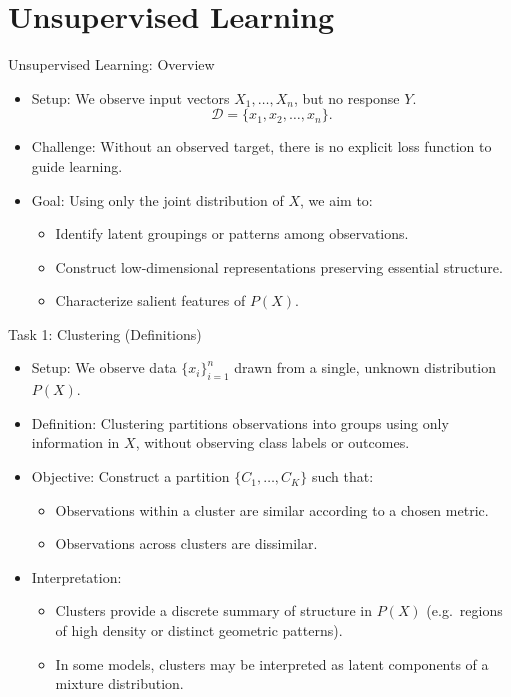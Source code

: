 \documentclass[aspectratio=169]{beamer}
\newcommand{\1}{\mathbf{1}}
\newcommand{\D}{\mathcal{D}}
\begin{document}
\section{Unsupervised Learning}

\begin{frame}{Unsupervised Learning: Overview}
    \small
    \begin{itemize}
        \item Setup: We observe input vectors $X_1, \dots, X_n$, but no response $Y$.
        \[
            \D = \{x_1, x_2, \dots, x_n\}.
        \]
        \item Challenge: Without an observed target, there is no explicit loss function to guide learning.
        \item Goal: Using only the joint distribution of $X$, we aim to:
        \begin{itemize}
            \item Identify latent groupings or patterns among observations.
            \item Construct low-dimensional representations preserving essential structure.
            \item Characterize salient features of $P(X)$.
        \end{itemize}
    \end{itemize}
\end{frame}


\begin{frame}{Task 1: Clustering (Definitions)}
    \small
    \begin{itemize}
        \item Setup:
        We observe data $\{x_i\}_{i=1}^n$ drawn from a single, unknown distribution $P(X)$.
        
        \item Definition:
        Clustering partitions observations into groups using only information in $X$,
        without observing class labels or outcomes.
        
        \item Objective:
        Construct a partition $\{C_1,\dots,C_K\}$ such that:
        \begin{itemize}
            \item Observations within a cluster are similar according to a chosen metric.
            \item Observations across clusters are dissimilar.
        \end{itemize}
        
        \item Interpretation:
        \begin{itemize}
            \item Clusters provide a discrete summary of structure in $P(X)$
            (e.g.\ regions of high density or distinct geometric patterns).
            \item In some models, clusters may be interpreted as latent components of a mixture distribution.
        \end{itemize}
    \end{itemize}
\end{frame}
\end{document}
